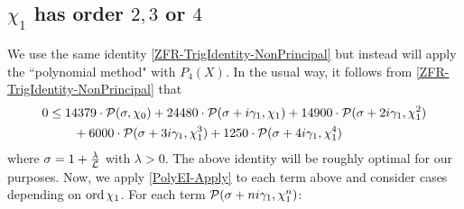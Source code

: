 \documentclass[12pt,psamsfonts]{amsart}
\theoremstyle{definition}
\theoremstyle{remark}
\numberwithin{equation}{section}
\begin{document}
\subsection*{$\chi_1$ has order $2, 3$ or $4$} We use the same identity \eqref{ZFR-TrigIdentity-NonPrincipal} but instead will apply the ``polynomial method" with $P_4(X)$. In the usual way, it follows from \eqref{ZFR-TrigIdentity-NonPrincipal} that
\begin{equation}
\begin{aligned}
0 & \leq 14379 \cdot \mathcal{P}(\sigma, \chi_0)  +  24480  \cdot \mathcal{P}(\sigma+i\gamma_1, \chi_1) +  14900 \cdot \mathcal{P}(\sigma+2i\gamma_1, \chi_1^2) \\
& \qquad +  6000 \cdot \mathcal{P}(\sigma + 3i\gamma_1, \chi_1^3) + 1250 \cdot \mathcal{P}(\sigma + 4i\gamma_1, \chi_1^4) \\
\end{aligned} 
\label{TrigIdentity-ZFR-Poly}
\end{equation}
where $\sigma = 1 + \tfrac{\lambda}{\mathcal{L}}$ with $\lambda > 0$. The above identity will be roughly optimal for our purposes. Now, we apply \cref{PolyEI-Apply} to each term above and consider cases depending on $\mathrm{ord}\, \chi_1$. For each term  $\mathcal{P}(\sigma+ni\gamma_1,\chi_1^n)$:
\end{document}
